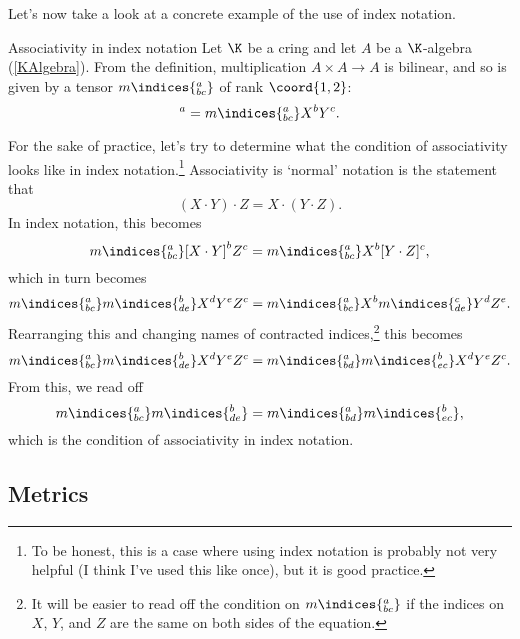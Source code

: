 Let's now take a look at a concrete example of the use of index notation.
\begin{exm}{Associativity in index notation}{}
	Let $\K$ be a cring and let $A$ be a $\K$-algebra (\cref{KAlgebra}).  From the definition, multiplication $A\times A\rightarrow A$ is bilinear, and so is given by a tensor $m\indices{^a_{bc}}$ of rank $\coord{1,2}$:
	\begin{equation}
		[X\cdot Y]^a=m\indices{^a_{bc}}X^bY^c.
	\end{equation}
	
	For the sake of practice, let's try to determine what the condition of associativity looks like in index notation.\footnote{To be honest, this is a case where using index notation is probably not very helpful (I think I've used this like once), but it is good practice.}  Associativity is `normal' notation is the statement that
	\begin{equation}
		(X\cdot Y)\cdot Z=X\cdot (Y\cdot Z).
	\end{equation}
	In index notation, this becomes
	\begin{equation}
		m\indices{^a_{bc}}[X\cdot Y]^bZ^c=m\indices{^a_{bc}}X^b[Y\cdot Z]^c,
	\end{equation}
	which in turn becomes
	\begin{equation}
		m\indices{^a_{bc}}m\indices{^b_{de}}X^dY^eZ^c=m\indices{^a_{bc}}X^bm\indices{^c_{de}}Y^dZ^e.
	\end{equation}
	Rearranging this and changing names of contracted indices,\footnote{It will be easier to read off the condition on $m\indices{^a_{bc}}$ if the indices on $X$, $Y$, and $Z$ are the same on both sides of the equation.} this becomes
	\begin{equation}
		m\indices{^a_{bc}}m\indices{^b_{de}}X^dY^eZ^c=m\indices{^a_{bd}}m\indices{^b_{ec}}X^dY^eZ^c.
	\end{equation}
	From this, we read off
	\begin{equation}
		m\indices{^a_{bc}}m\indices{^b_{de}}=m\indices{^a_{bd}}m\indices{^b_{ec}},
	\end{equation}
	which is the condition of associativity in index notation.
\end{exm}

\subsection{Metrics}

